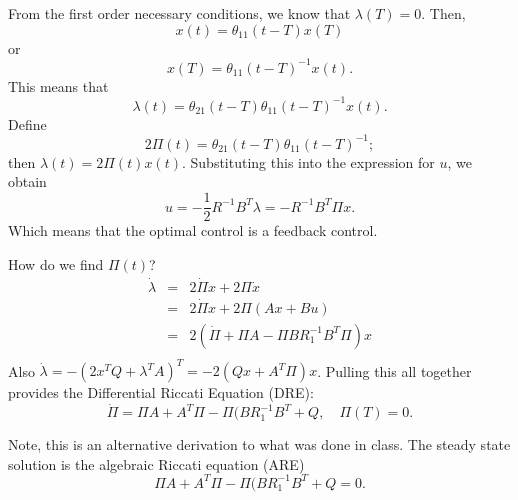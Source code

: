 From the first order necessary conditions, we know that $\lambda(T) = 0$. Then,
$$x(t) = \theta_{11}(t - T)x(T)$$ or $$x(T) = \theta_{11}(t - T)^{-1}x(t).$$ 
This means that 
$$\lambda(t) = \theta_{21}(t-T)\theta_{11}(t-T)^{-1}x(t).$$
Define $$2\Pi(t) = \theta_{21}(t-T)\theta_{11}(t-T)^{-1};$$ then $\lambda(t) = 2\Pi(t)x(t)$. Substituting this into the expression for $u$, we obtain 
$$u = -\frac 1 2 R^{-1}B^T\lambda = -R^{-1}B^T\Pi x.$$Which means that the optimal control is a feedback control.  

How do we find $\Pi(t)$?
\begin{eqnarray*}
\dot \lambda &=& 2\dot\Pi x + 2\Pi \dot x\\
&=& 2\dot\Pi x + 2\Pi (Ax+Bu)\\
&=& 2\left(\dot\Pi  + \Pi A   - \Pi B R_1^{-1}B^T\Pi  \right)x \\
\end{eqnarray*}
Also $\dot\lambda = -(2x^TQ + \lambda^TA)^T = -2(Qx + A^T\Pi)x$.  Pulling this all together provides the Differential Riccati Equation (DRE):
$$\dot\Pi = \Pi A + A^T\Pi - \Pi(BR_1^{-1}B^T  + Q, \quad \Pi(T) = 0.$$

Note, this is an alternative derivation to what was done in class.  The steady state solution is the algebraic Riccati equation (ARE)
$$\Pi A + A^T\Pi - \Pi(BR_1^{-1}B^T  + Q = 0.$$


